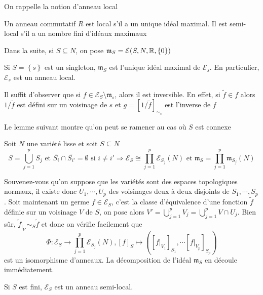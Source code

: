 \documentclass[memoire.tex]{subfiles}
\begin{document}
On rappelle la notion d'anneau local 
\begin{definition}
    Un anneau commutatif $R$ est local s'il a un unique idéal maximal. Il est semi-local s'il a un nombre fini d'idéaux maximaux
\end{definition}
Dans la suite, si $S\subseteq N$, on pose $\mathfrak{m}_S=\mathcal{E}(S,N,\mathbb{R},\{0\})$
\begin{proposition}
    Si $S=\left\{s\right\}$ est un singleton,
    $\mathfrak{m}_S$ est l'unique idéal maximal de $\mathcal{E}_s$. En particulier, $\mathcal{E}_{s}$ est un anneau local.
\end{proposition}
\begin{preuve}
Il suffit d'observer que si $f\in\mathcal{E}_S
\setminus\mathfrak{m}_s$, alors il est  inversible. En effet, 
si $\tilde{f}\in f$ alors $1/\tilde{f}$ est défini sur un 
voisinage de $s$ et $g=[1/\tilde{f}]_{\sim_s}$ est 
l'inverse de $f$
\end{preuve}
Le lemme suivant montre qu'on peut se ramener au cas où $S$ est connexe
\begin{proposition}\label{décomposition}
    Soit $N$ une variété lisse  et soit $S\subseteq N$
    \begin{equation*}
        S=\bigcup_{j=1}^p S_j\text{ et } \bar{S_i}\cap 
        \bar{S_{i'}}=\emptyset\text{ si } i\neq i'\Rightarrow \mathcal{E}_S\cong \prod_{j=1}^p \mathcal{E}_{S_j}(N)\text{ et }\mathfrak{m}_S=\prod_{j=1}^p \mathfrak{m}_{S_j}(N)
    \end{equation*}
\end{proposition}
\begin{preuve}
    Souvenez-vous qu'on suppose que les variétés sont des espaces topologiques normaux, il existe donc $U_1,\cdots,U_p$ des voisinages deux à deux disjoints de $S_1,\cdots,S_p$. Soit maintenant un germe  $f\in\mathcal{E}_S$, c'est la classe d’équivalence d'une fonction $\tilde{f}$ définie sur un voisinage $V$ de $S$, on pose alors $V'=\bigcup_{j=1}^p V_j=\bigcup_{j=1}^p V\cap U_j$. Bien sûr, 
    $\tilde{f}_{|_{V'}}\sim_{S} \tilde{f}$
    et donc on vérifie facilement que 
    \begin{equation*}
        \Phi : \mathcal{E}_S\rightarrow \prod_{j=1}^p 
        \mathcal{E}_{S_j}(N), [f]_S\mapsto ([f|_{V_1}]_{S_1},\cdots [f|_{V_p}]_{S_p} )
    \end{equation*}
    est un isomorphisme d'anneaux. La décomposition de l'idéal $\mathfrak{m}_S$ en découle immédiatement.
\end{preuve}
\begin{corollaire}
    Si $S$ est fini, $\mathcal{E}_S$ est un anneau semi-local.
\end{corollaire}
\end{document}

